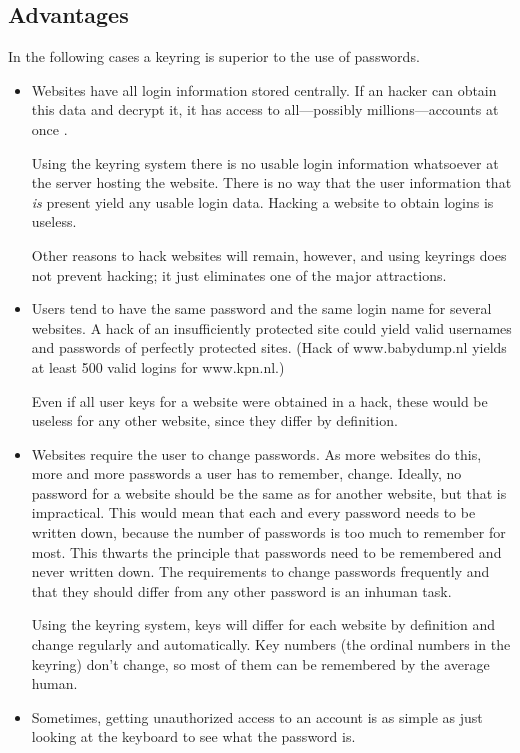 \subsection{Advantages}
In the following cases a keyring is superior to the use of passwords.
\begin{itemize}
\item Websites have all login information stored centrally.
If an hacker can obtain this data and decrypt it, it has access to all---possibly millions---accounts at once \cite{wiki:linkedin}.
\par
Using the keyring system there is no usable login information whatsoever at the server hosting the website.
There is no way that the user information that \emph{is} present yield any usable login data.
Hacking a website to obtain logins is useless.
\par
Other reasons to hack websites will remain, however, and using keyrings does not prevent hacking; it just eliminates one of the major attractions.
\item Users tend to have the same password and the same login name for several websites.
A hack of an insufficiently protected site could yield valid usernames and passwords of perfectly protected sites.
(Hack of www.babydump.nl yields at least 500 valid logins for www.kpn.nl.)
\par
Even if all user keys for a website were obtained in a hack, these would be useless for any other website, since they differ by definition.
\item Websites require the user to change passwords.
As more websites do this, more and more passwords a user has to remember, change.
Ideally, no password for a website should be the same as for another website, but that is impractical.
This would mean that each and every password needs to be written down, because the number of passwords is too much to remember for most.
This thwarts the principle that passwords need to be remembered and never written down.
The requirements to change passwords frequently and that they should differ from any other password is an inhuman task.
\par
Using the keyring system, keys will differ for each website by definition and change regularly and automatically.
Key numbers (the ordinal numbers in the keyring) don't change, so most of them can be remembered by the average human.
\item Sometimes, getting unauthorized access to an account is as simple as just looking at the keyboard to see what the password is.

\end{itemize}
